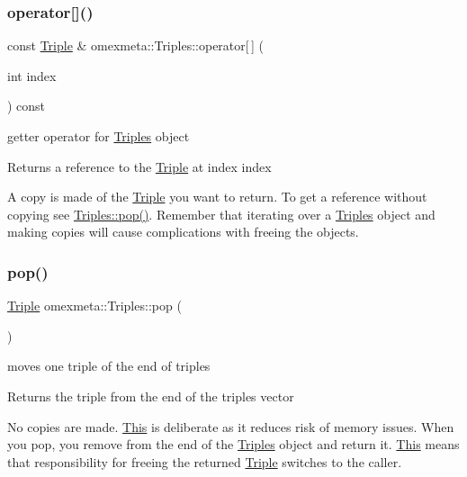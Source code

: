 \subsubsection{\texorpdfstring{operator[]()}{operator[]()}}
{\footnotesize\ttfamily const \hyperlink{classomexmeta_1_1Triple}{Triple} \& omexmeta\+::\+Triples\+::operator\mbox{[}$\,$\mbox{]} (\begin{DoxyParamCaption}\item[{int}]{index }\end{DoxyParamCaption}) const}



getter operator for \hyperlink{classomexmeta_1_1Triples}{Triples} object 

\begin{DoxyReturn}{Returns}
a reference to the \hyperlink{classomexmeta_1_1Triple}{Triple} at index {\ttfamily index}
\end{DoxyReturn}
A copy is made of the \hyperlink{classomexmeta_1_1Triple}{Triple} you want to return. To get a reference without copying see \hyperlink{classomexmeta_1_1Triples_a5dad8f2cde0a3f6c0ce341338f80b0cd}{Triples\+::pop()}. Remember that iterating over a \hyperlink{classomexmeta_1_1Triples}{Triples} object and making copies will cause complications with freeing the objects. \mbox{\label{classomexmeta_1_1Triples_a5dad8f2cde0a3f6c0ce341338f80b0cd}} 
\subsubsection{\texorpdfstring{pop()}{pop()}}
{\footnotesize\ttfamily \hyperlink{classomexmeta_1_1Triple}{Triple} omexmeta\+::\+Triples\+::pop (\begin{DoxyParamCaption}{ }\end{DoxyParamCaption})}



moves one triple of the end of triples 

\begin{DoxyReturn}{Returns}
the triple from the end of the triples vector
\end{DoxyReturn}
No copies are made. \hyperlink{classThis}{This} is deliberate as it reduces risk of memory issues. When you pop, you remove from the end of the \hyperlink{classomexmeta_1_1Triples}{Triples} object and return it. \hyperlink{classThis}{This} means that responsibility for freeing the returned \hyperlink{classomexmeta_1_1Triple}{Triple} switches to the caller. \mbox{\label{classomexmeta_1_1Triples_abb333b83c7a8ed1f210816ef88c8d3a0}} 
